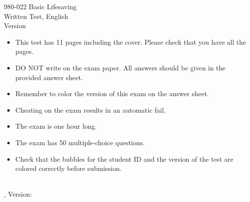 \documentclass[a4paper,16pt]{examdesign}
\begin{document}
\begin{frontmatter}
	\vspace*{2in}
	\begin{center}
		{\huge 980-022 Basic Lifesaving} \\
		\vspace{1in}
		{\huge Written Test, English} \\
		\vspace{1in}
		{\huge Version } \\
		\vspace{1in}
		\begin{itemize}
		\item This test has 11 pages including the cover. Please check that you have all the pages. 
		\item DO NOT write on the exam paper. All answers should be given in the provided answer sheet.
		\item Remember to color the version of this exam on the answer sheet.
		\item Cheating on the exam results in an automatic fail.
		\item The exam is one hour long. 
		\item The exam has 50 multiple-choice questions.
		\item Check that the bubbles for the student ID and the version of the test are colored correctly before submission.
		\end{itemize}
	\end{center}
	\vfill
\end{frontmatter}


\begin{examtop}
	{\parbox{3in}{\classdata \\
	\examtype, Version: }}
\end{examtop}
\end{document}
